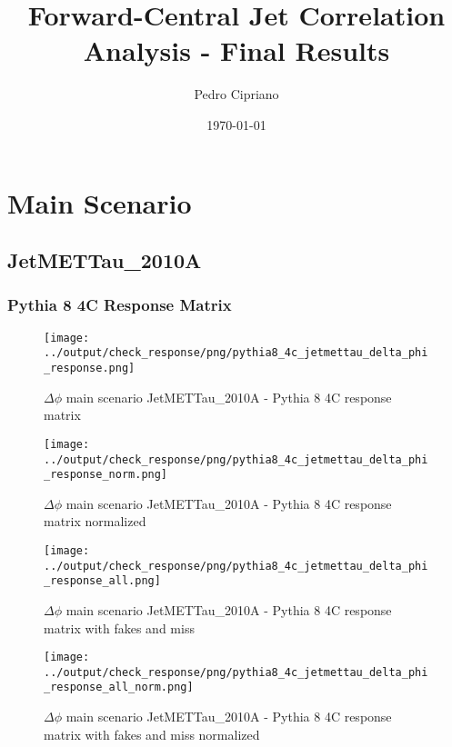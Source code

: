 \documentclass[11pt]{book}
\begin{document}
         
 
 \author{Pedro Cipriano}
 \date{\today}
 \title{Forward-Central Jet Correlation Analysis - Final Results}

\maketitle

\tableofcontents

\newpage
\chapter{Main Scenario}
\section{JetMETTau\_2010A}
\subsection{Pythia 8 4C Response Matrix}

\begin{figure}[ht]
\centering
\texttt{[image: ../output/check\_response/png/pythia8\_4c\_jetmettau\_delta\_phi\_response.png]}
\caption{$\Delta\phi$ main scenario JetMETTau\_2010A - Pythia 8 4C response matrix}
\label{p8_jetmettau_delta_phi_response}
\end{figure}

\begin{figure}[ht]
\centering
\texttt{[image: ../output/check\_response/png/pythia8\_4c\_jetmettau\_delta\_phi\_response\_norm.png]}
\caption{$\Delta\phi$ main scenario JetMETTau\_2010A - Pythia 8 4C response matrix normalized}
\label{p8_jetmettau_delta_phi_response_norm}
\end{figure}

\begin{figure}[ht]
\centering
\texttt{[image: ../output/check\_response/png/pythia8\_4c\_jetmettau\_delta\_phi\_response\_all.png]}
\caption{$\Delta\phi$ main scenario JetMETTau\_2010A - Pythia 8 4C response matrix with fakes and miss}
\label{p8_jetmettau_delta_phi_response_all}
\end{figure}

\begin{figure}[ht]
\centering
\texttt{[image: ../output/check\_response/png/pythia8\_4c\_jetmettau\_delta\_phi\_response\_all\_norm.png]}
\caption{$\Delta\phi$ main scenario JetMETTau\_2010A - Pythia 8 4C response matrix with fakes and miss normalized}
\label{p8_jetmettau_delta_phi_response_all_norm}
\end{figure}
\end{document}
